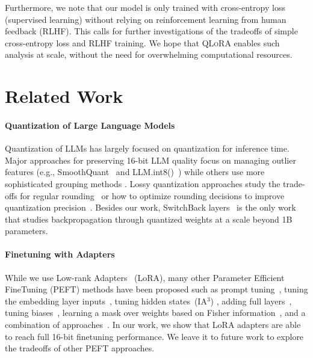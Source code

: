 Furthermore, we note that our model is only trained with cross-entropy loss (supervised learning) without relying on reinforcement learning from human feedback (RLHF). This calls for further investigations of the tradeoffs of simple cross-entropy loss and RLHF training. We hope that \textsc{QLoRA} enables such analysis at scale, without the need for overwhelming computational resources.

\section{Related Work}

\paragraph{Quantization of Large Language Models} Quantization of LLMs has largely focused on quantization for inference time. Major approaches for preserving 16-bit LLM quality focus on managing outlier features (e.g., SmoothQuant~\citep{xiao2022smoothquant} and LLM.int8()~\citep{dettmers2022llm}) while others use more sophisticated grouping methods \citep{park2022nuqmm, yao2022zeroquant}. Lossy quantization approaches study the trade-offs for regular rounding~\citep{dettmers2022case,zeng2022glm,pope2022efficiently} or how to optimize rounding decisions to improve quantization precision~\citep{frantar2022gptq}. Besides our work, SwitchBack layers~\citep{wortsman2023stable} is the only work that studies backpropagation through quantized weights at a scale beyond 1B parameters.

\paragraph{Finetuning with Adapters} While we use Low-rank Adapters~\citep{hu2021lora} (LoRA), many other Parameter Efficient FineTuning (PEFT) methods have been proposed such as prompt tuning~\citep{qin2021learning,lester2021power,li2021prefix}, tuning the embedding layer inputs~\citep{an2022input}, tuning hidden states~(IA$^3$) \citep{liu2022few}, adding full layers~\citep{houlsby2019parameter}, tuning biases~\citep{zaken2021bitfit}, learning a mask over weights based on Fisher information~\citep{sung2021training}, and a combination of approaches~\citep{henderson2021compacter}. In our work, we show that LoRA adapters are able to reach full 16-bit finetuning performance. We leave it to future work to explore the tradeoffs of other PEFT approaches.

